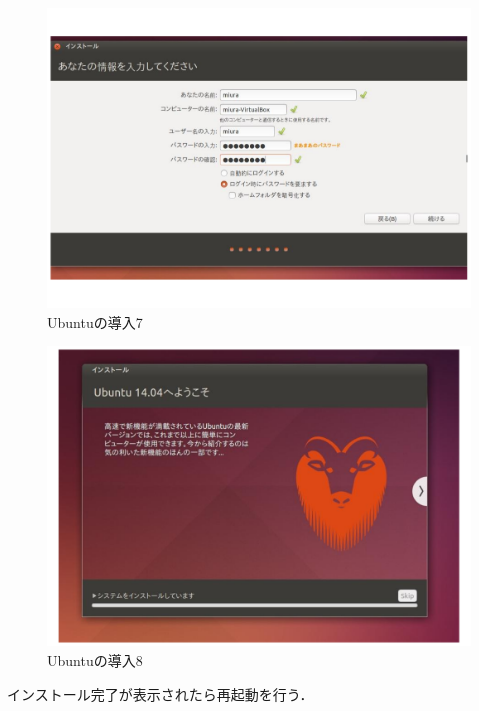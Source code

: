 \begin{figure}[H]
\centering
\includegraphics[width=13cm]{figure13.pdf}
\caption{Ubuntuの導入7}\label{sannp}
\end{figure}

\begin{figure}[H]
\centering
\includegraphics[width=13cm]{figure14.pdf}
\caption{Ubuntuの導入8}\label{sannp}
\end{figure}

インストール完了が表示されたら再起動を行う．

